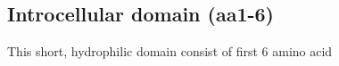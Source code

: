 \subsection{Introcellular domain (aa1-6)}

This short, hydrophilic domain consist of first 6 amino acid